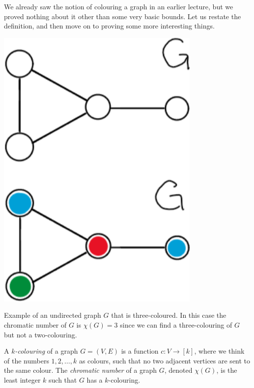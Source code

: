 \documentclass[nobib]{tufte-handout}
\begin{document}
We already saw the notion of colouring a graph in an earlier lecture, but we proved nothing about it other than some very basic bounds. Let us restate the definition, and then move on to proving some more interesting things.
\begin{marginfigure}
    \centering
    \includegraphics[width=0.75\textwidth]{graphics/L12_colouring/k-coloring.png}
    \caption{
    Example of an undirected graph $G$ that is three-coloured. In this case the chromatic number of $G$ is $\chi(G)=3$ since we can find a three-colouring of $G$ but not a two-colouring.
    }
\end{marginfigure}
\begin{definition}
  A \emph{$k$-colouring} of a graph $G = (V,E)$ is a function $c: V \to [k]$, where we think of the numbers $1,2,\ldots,k$ as colours, such that no two adjacent vertices are sent to the same colour. The \emph{chromatic number} of a graph $G$, denoted $\chi(G)$, is the least integer $k$ such that $G$ has a $k$-colouring.
\end{definition}
\end{document}
